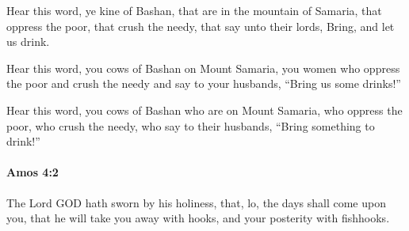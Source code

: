 			\begin{versebox}
					\item[BHS] 
					\item[LXX] 
					\item[ASV] Hear this word, ye kine of Bashan, that are in the mountain of Samaria, that oppress the poor, that crush the needy, that say unto their lords, Bring, and let us drink.
					\item[NIV] Hear this word, you cows of Bashan on Mount Samaria, you women who oppress the poor and crush the needy and say to your husbands, “Bring us some drinks!”
					\item[NRSV] Hear this word, you cows of Bashan who are on Mount Samaria, who oppress the poor, who crush the needy, who say to their husbands, “Bring something to drink!”
			\end{versebox}

		\paragraph{Amos 4:2} %
			\label{AMOS-4-2}

			The Lord GOD hath sworn by his holiness, that, lo, the days shall come upon you, that he will take you away with hooks, and your posterity with fishhooks.

